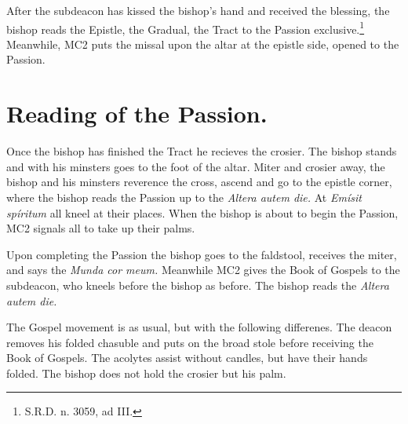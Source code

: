 {\rubric After the subdeacon has kissed the bishop's hand and received the
blessing, the bishop reads the Epistle, the Gradual, the Tract to the Passion
exclusive.\footnote{S.R.D. n. 3059, ad III.} Meanwhile, MC2 puts the missal
upon the altar at the epistle side, opened to the Passion.

\section{Reading of the Passion.}

\rubric Once the bishop has finished the Tract he recieves the crosier. The
bishop stands and with his minsters goes to the foot of the altar. Miter and
crosier away, the bishop and his minsters reverence the cross, ascend and go to
the epistle corner, where the bishop reads the Passion up to the \textit{Altera
autem die.} At \textit{Emísit spíritum} all kneel at their places. When the
bishop is about to begin the Passion, MC2 signals all to take up their palms.

\rubric Upon completing the Passion the bishop goes to the faldstool, receives
the miter, and says the \textit{Munda cor meum.} Meanwhile MC2 gives the Book
of Gospels to the subdeacon, who kneels before the bishop as before. The bishop
reads the \textit{Altera autem die.}

\rubric The Gospel movement is as usual, but with the following differenes. The
deacon removes his folded chasuble and puts on the broad stole before receiving
the Book of Gospels. The acolytes assist without candles, but have their hands
folded. The bishop does not hold the crosier but his palm.

}
